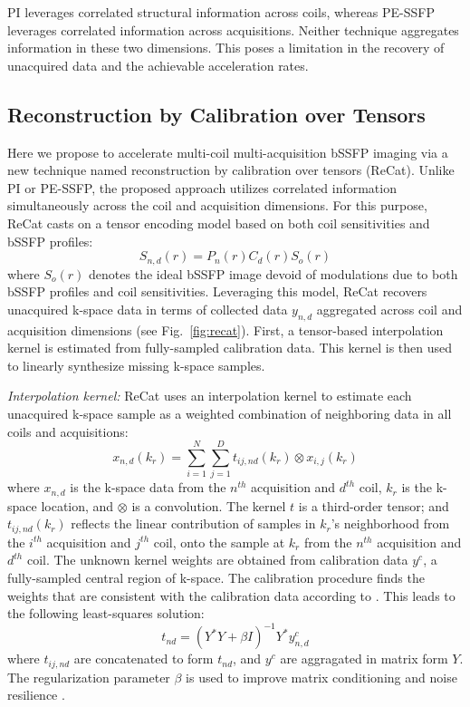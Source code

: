 \documentclass[11pt, onecolumn]{article}
\begin{document}
PI leverages correlated structural information across coils, whereas PE-SSFP leverages correlated information across acquisitions. Neither technique aggregates information in these two dimensions. This poses a limitation in the recovery of unacquired data and the achievable acceleration rates. 


\subsection*{Reconstruction by Calibration over Tensors}
Here we propose to accelerate multi-coil multi-acquisition bSSFP imaging via a new technique named reconstruction by calibration over tensors (ReCat). Unlike PI or PE-SSFP, the proposed approach utilizes correlated information simultaneously across the coil and acquisition dimensions. For this purpose, ReCat casts on  a tensor encoding model based on both coil sensitivities and bSSFP profiles:
\begin{equation}
\label{eq:invprob}
{S_{n,d}}(r)={P_n}(r){C_d}(r){S_o}(r)
\end{equation}
where $S_o (r)$ denotes the ideal bSSFP image devoid of modulations due to both bSSFP profiles and coil sensitivities. Leveraging this model, ReCat recovers unacquired k-space data in terms of collected data $y_{n,d}$ aggregated across coil and acquisition dimensions (see Fig.~\ref{fig:recat}). First, a tensor-based interpolation kernel is estimated from fully-sampled calibration data. This kernel is then used to linearly synthesize missing k-space samples.

\textit{Interpolation kernel:} ReCat uses an interpolation kernel to estimate each unacquired k-space sample as a weighted combination of neighboring data in all coils and acquisitions:
\begin{equation}
\label{eq:interp}
{x_{n,d}}({k_r})=\sum\limits_{i=1}^N {\sum\limits_{j=1}^D {{t_{ij,nd}}({k_r}) \otimes {x_{i,j}}({k_r})} } 
\end{equation}
where $x_{n,d}$ is the k-space data from the $n^{th}$ acquisition and $d^{th}$ coil, $k_r$ is the k-space location, and $\otimes$ is a convolution. The kernel $t$ is a third-order tensor; and ${t_{ij,nd}}({k_r})$ reflects the linear contribution of samples in $k_r$'s neighborhood from the $i^{th}$ acquisition and $j^{th}$ coil, onto the sample at $k_r$ from the $n^{th}$ acquisition and $d^{th}$ coil. The unknown kernel weights are obtained from calibration data $y^{c}$, a fully-sampled central region of k-space. The calibration procedure finds the weights that are consistent with the calibration data according to . This leads to the following least-squares solution:
\begin{equation}
{t_{nd}}={({Y^*}Y + \beta I)^{ - 1}}{Y^*}{y^{c}_{n,d}}
\end{equation}
where ${t_{ij,nd}}$ are concatenated to form $t_{nd}$, and $y^{c}$ are aggragated in matrix form $Y$. The regularization parameter $\beta$ is used to improve matrix conditioning and noise resilience \cite{Murphy:2012hq}. 
\end{document}
